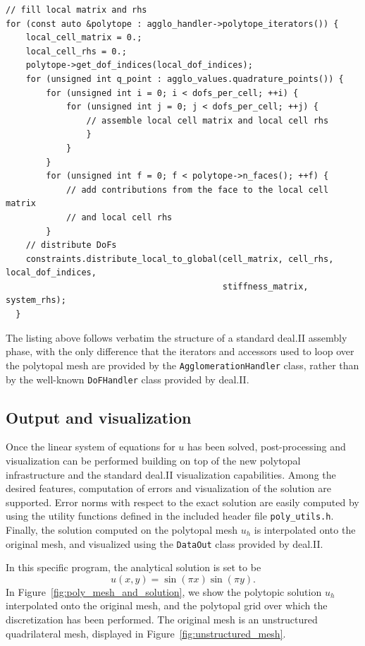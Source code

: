 \documentclass[a4paper,12pt]{article}
\begin{document}
\begin{lstlisting}[caption=Assembly of stiffness matrix and rhs vector]
   // fill local matrix and rhs
for (const auto &polytope : agglo_handler->polytope_iterators()) {
    local_cell_matrix = 0.;
    local_cell_rhs = 0.;
    polytope->get_dof_indices(local_dof_indices);
    for (unsigned int q_point : agglo_values.quadrature_points()) {
        for (unsigned int i = 0; i < dofs_per_cell; ++i) {
            for (unsigned int j = 0; j < dofs_per_cell; ++j) {
                // assemble local cell matrix and local cell rhs
                }
            }
        }
        for (unsigned int f = 0; f < polytope->n_faces(); ++f) {
            // add contributions from the face to the local cell matrix
            // and local cell rhs
        }
    // distribute DoFs
    constraints.distribute_local_to_global(cell_matrix, cell_rhs, local_dof_indices,
                                           stiffness_matrix, system_rhs);
  }
\end{lstlisting}

The listing above follows verbatim the structure of a standard deal.II assembly phase, with the only difference that the
iterators and accessors used to loop over the polytopal mesh are provided by the \texttt{AgglomerationHandler} class, rather
than by the well-known \texttt{DoFHandler} class provided by deal.II.


\subsection{Output and visualization}
Once the linear system of equations for $u$ has been solved, post-processing and visualization can be performed
building on top of the new polytopal infrastructure and the standard deal.II visualization capabilities.
Among the desired features, computation of errors and visualization of the solution are supported.
Error norms with respect to the exact solution are easily computed by using the
utility functions defined in the included header file \texttt{poly\_utils.h}. Finally, the solution
computed on the polytopal mesh $u_h$ is interpolated onto the original mesh, and visualized using the \texttt{DataOut} class
provided by deal.II.

In this specific program, the analytical solution is set to be
\[
  u(x,y)=\sin(\pi x)\sin(\pi y).
\]
In Figure~\ref{fig:poly_mesh_and_solution}, we
show the polytopic solution $u_h$ interpolated onto the original mesh, and the polytopal grid over which the discretization has
been performed. The original mesh is an unstructured quadrilateral mesh, displayed in Figure~\ref{fig:unstructured_mesh}.
\end{document}
